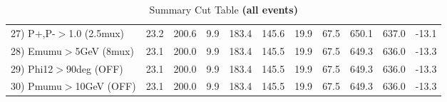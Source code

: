 \begin{table}[h!]
{{\begin{tabular}{||l||r|r|r|r|r|r|r||r||r||r||}
 27) P+,P-$>$1.0 (2.5mux) &      23.2 &     200.6 &       9.9 &     183.4 &     145.6 &      19.9 &      67.5 &     650.1 &     637.0 &     -13.1 \\
 28) Emumu$>$5GeV  (8mux) &      23.1 &     200.0 &       9.9 &     183.4 &     145.5 &      19.9 &      67.5 &     649.3 &     636.0 &     -13.3 \\
 29) Phi12$>$90deg  (OFF) &      23.1 &     200.0 &       9.9 &     183.4 &     145.5 &      19.9 &      67.5 &     649.3 &     636.0 &     -13.3 \\
 30) Pmumu$>$10GeV  (OFF) &      23.1 &     200.0 &       9.9 &     183.4 &     145.5 &      19.9 &      67.5 &     649.3 &     636.0 &     -13.3 \\
 \hline
 \hline
 \end{tabular}
 \caption{Summary Cut Table \textbf{ (all events)}}
 \label{tab-sumcut}
 }}
 \end{table}
 \endinput
